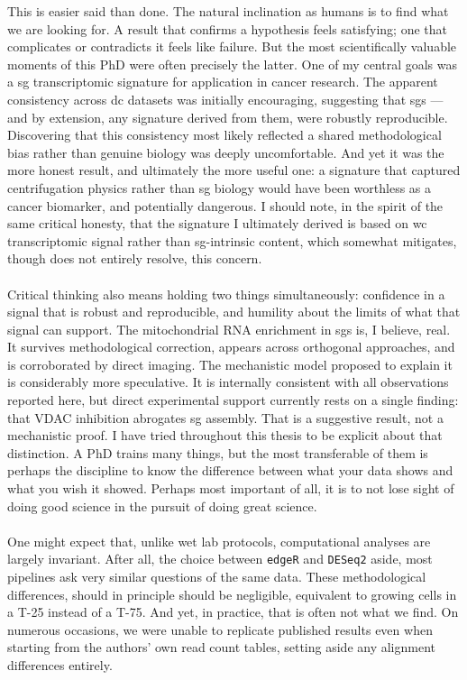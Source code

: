 This is easier said than done. The natural inclination as humans is to find what we are looking for. A result that confirms a hypothesis feels satisfying; one that complicates or contradicts it feels like failure. But the most scientifically valuable moments of this PhD were often precisely the latter. One of my central goals was a \gls{sg} transcriptomic signature for application in cancer research. The apparent consistency across \gls{dc} datasets was initially encouraging, suggesting that \gls{sg}s — and by extension, any signature derived from them, were robustly reproducible. Discovering that this consistency most likely reflected a shared methodological bias rather than genuine biology was deeply uncomfortable. And yet it was the more honest result, and ultimately the more useful one: a signature that captured centrifugation physics rather than \gls{sg} biology would have been worthless as a cancer biomarker, and potentially dangerous. I should note, in the spirit of the same critical honesty, that the signature I ultimately derived is based on \gls{wc} transcriptomic signal rather than \gls{sg}-intrinsic content, which somewhat mitigates, though does not entirely resolve, this concern.
\\
\\
Critical thinking also means holding two things simultaneously: confidence in a signal that is robust and reproducible, and humility about the limits of what that signal can support. The mitochondrial RNA enrichment in \glspl{sg} is, I believe, real. It survives methodological correction, appears across orthogonal approaches, and is corroborated by direct imaging. The mechanistic model proposed to explain it is considerably more speculative. It is internally consistent with all observations reported here, but direct experimental support currently rests on a single finding: that VDAC inhibition abrogates \gls{sg} assembly. That is a suggestive result, not a mechanistic proof. I have tried throughout this thesis to be explicit about that distinction. A PhD trains many things, but the most transferable of them is perhaps the discipline to know the difference between what your data shows and what you wish it showed. Perhaps most important of all, it is to not lose sight of doing good science in the pursuit of doing great science.
\\
\\
One might expect that, unlike wet lab protocols, computational analyses are largely invariant. After all, the choice between \texttt{edgeR} and \texttt{DESeq2} aside, most pipelines ask very similar questions of the same data. These methodological differences, should in principle should be negligible, equivalent to growing cells in a T-25 instead of a T-75. And yet, in practice, that is often not what we find. On numerous occasions, we were unable to replicate published results even when starting from the authors' own read count tables, setting aside any alignment differences entirely.
